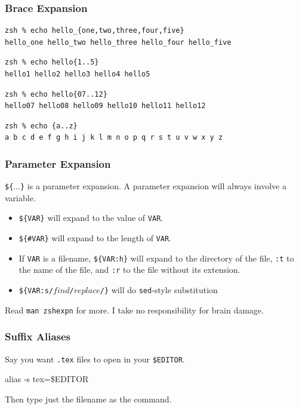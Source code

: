 \documentclass{beamer}
\begin{document}
\begin{frame}[fragile]
    \frametitle{Brace Expansion}
    \begin{verbatim}zsh % echo hello_{one,two,three,four,five}
hello_one hello_two hello_three hello_four hello_five\end{verbatim}
\pause

    \begin{verbatim}zsh % echo hello{1..5}
hello1 hello2 hello3 hello4 hello5\end{verbatim}
\pause

    \begin{verbatim}zsh % echo hello{07..12}
hello07 hello08 hello09 hello10 hello11 hello12\end{verbatim}
\pause

    \begin{verbatim}zsh % echo {a..z}
a b c d e f g h i j k l m n o p q r s t u v w x y z\end{verbatim}
\end{frame}

\begin{frame}
    \frametitle{Parameter Expansion}
    \texttt{\$\{}...\texttt{\}} is a parameter expansion. A parameter expansion
    will always involve a variable.
    \begin{itemize}[<+->]
        \item \texttt{\$\{VAR\}} will expand to the value of \texttt{VAR}.
        \item \texttt{\$\{\#VAR\}} will expand to the length of \texttt{VAR}.
        \item If \texttt{VAR} is a filename, \texttt{\$\{VAR:h\}} will expand
            to the directory of the file, \texttt{:t} to the name of the file,
            and \texttt{:r} to the file without its extension.
        \item \texttt{\$\{VAR:s/$find$/$replace$/\}} will do \texttt{sed}-style
            substitution
    \end{itemize}

    \pause

    Read \texttt{man zshexpn} for more. I take no responsibility for brain
    damage.
\end{frame}

\begin{frame}
    \frametitle{Suffix Aliases}
    \centering
    Say you want \texttt{.tex} files to open in your \texttt{\$EDITOR}.

    \medskip
    {\Large\ttfamily alias -s tex=\$EDITOR\par}
    \medskip

    Then type just the filename as the command.
\end{frame}
\end{document}

